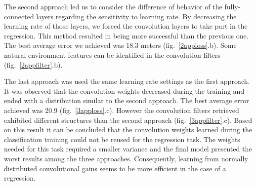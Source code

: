The second approach led us to consider the difference of behavior of the fully-connected layers regarding the sensitivity to learning rate. By decreasing the learning rate of those layers, we forced the convolution layers to take part in the regression. This method resulted in being more successful than the previous one. The best average error we achieved was 18.3 meters (fig.~\ref{2apploss}.b). Some natural environment features can be identified in the convolution filters (fig.~\ref{2appfilter}.b).

The last approach was used the same learning rate settings as the first approach. It was observed that the convolution weights decreased during the training and ended with a distribution similar to the second approach. The best average error achieved was 20.9 (fig.~\ref{3apploss}.c). However the convolution filters retrieved exhibited different structures than the second approach (fig.~\ref{3appfilter}.c). Based on this result it can be concluded that the convolution weights learned during the classification training could not be reused for the regression task. The weights needed for this task required a smaller variance and the final model presented the worst results among the three approaches. Consequently, learning from normally distributed convolutional gains seems to be more efficient in the case of a regression.

